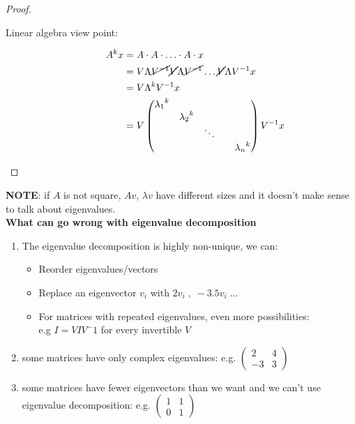 \documentclass[computational_mathematics.tex]{subfiles}
\begin{document}
\begin{proof}
  \begin{description}
  \item[{\sc Linear algebra view point:}]
    \begin{equation}
      \begin{split}
        A^k x &= A \cdot A \cdot \ldots \cdot A \cdot x\\
        &=V \Lambda \cancel{{V}^{-1}} \cancel{V} \Lambda \cancel{{V}^{-1}} \ldots \cancel{V} \Lambda {V}^{-1} x\\
        &= V \Lambda^k {V}^{-1} x\\
        &=V \begin{pmatrix}
          {\lambda_1}^k\\
          & {\lambda_2}^k\\
          && \ddots\\
          &&&& {\lambda_n}^k\\
        \end{pmatrix}
        {V}^{-1} x
      \end{split}
    \end{equation}

  \end{description}
\end{proof}

\noindent \textbf{NOTE}: if $A$ is not square, $Av$, $\lambda v$ have different sizes and it doesn't make sense to talk about eigenvalues.\\

\noindent \textbf{What can go wrong with eigenvalue decomposition}
\begin{enumerate}
    \item  The eigenvalue decomposition is highly non-unique, we can:
    \begin{itemize}
        \item Reorder eigenvalues/vectors
        \item Replace an eigenvector $v_i$ with $2v_i \;,\; −3.5v_i\; \dots$
        \item For matrices with repeated eigenvalues, even more possibilities:\\
        e.g $I = VIV^-1$ for every invertible $V$
    \end{itemize}
    
    \item  some matrices have only complex eigenvalues: e.g. $\begin{pmatrix} 2 & 4\\ -3 & 3\end{pmatrix}$
    
    \item some matrices have fewer eigenvectors than we want and we can't use eigenvalue decomposition: e.g. $\begin{pmatrix} 1 & 1\\ 0 & 1\end{pmatrix}$
    
\end{enumerate}
\end{document}
